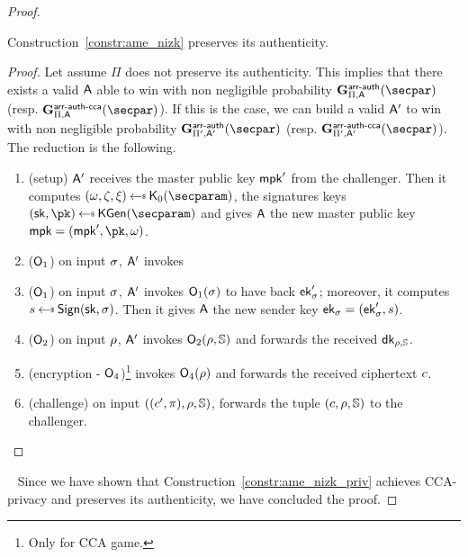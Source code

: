 \begin{proof}
    \begin{lemma}\label{lemma:ame_auth_same}
        Construction~\ref{constr:ame_nizk} preserves its authenticity.
        \begin{proof}
            Let assume $\Pi$ does not preserve its authenticity.
            This implies that there exists a valid $\mathsf{A}$ able to win with non negligible probability $\NISHeufgame{\arranged}_{\Pi, \adversary}(\secpar)$ (resp. $\NISHeufgamecca{\arranged}_{\Pi, \adversary}(\secpar)$).
            If this is the case, we can build a valid $\mathsf{A}'$ to win with non negligible probability $\NISHeufgame{\arranged}_{\Pi', \adversary'}(\secpar)$ (resp. $\NISHeufgamecca{\arranged}_{\Pi', \adversary'}(\secpar)$).
            The reduction is the following.

            \begin{enumerate}
                \item (setup) $\mathsf{A}'$ receives the master public key $\mathsf{mpk}'$ from the challenger. Then it computes $(\crs,\tpsim,\tpext)\getsr\nizkext_0(\secparam)$, the signatures keys $(\sk, \pk) \getsr \kgen(\secparam)$ and gives $\mathsf{A}$ the new master public key $\mpk = (\mpk', \pk, \crs)$.
                \item ($\mathsf{O}_1$) on input $\sigma$, $\mathsf{A}'$ invokes \item ($\mathsf{O}_1$) on input $\sigma$, $\mathsf{A}'$ invokes $\mathsf{O}_1(\sigma)$ to have back $\mathsf{ek}'_\sigma$; moreover, it computes $\signature \getsr \sign(\sk, \sattr)$. Then it gives $\mathsf{A}$ the new sender key $\mathsf{ek}_\sigma = (\mathsf{ek}'_\sigma, s)$.
                \item ($\mathsf{O}_2$) on input $\rho$, $\mathsf{A}'$ invokes $\mathsf{O}_2(\rho, \mathbb{S})$ and forwards the received $\mathsf{dk}_{\rho, \mathbb{S}}$.
                \item (encryption - $\mathsf{O}_4$)\footnote{Only for CCA game.} invokes $\mathsf{O}_4(\rho)$ and forwards the received ciphertext $c$.
                \item (challenge) on input $((c', \pi), \rho, \mathbb{S})$, forwards the tuple $(c, \rho, \mathbb{S})$ to the challenger.
            \end{enumerate}
        \end{proof}
    \end{lemma}
    ~\newline
    Since we have shown that Construction~\ref{constr:ame_nizk_priv} achieves CCA-privacy and preserves its authenticity, we have concluded the proof.
\end{proof}
